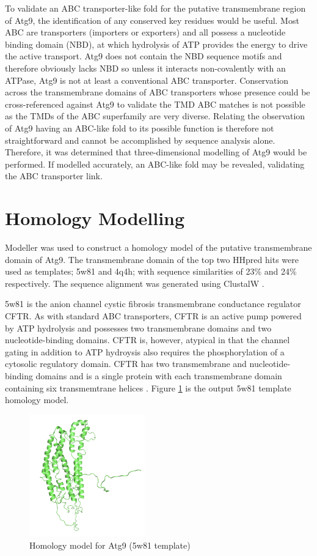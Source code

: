 To validate an ABC transporter-like fold for the putative transmembrane region of Atg9, the identification of any conserved key residues would be useful. Most ABC are transporters (importers or exporters) and all possess a nucleotide binding domain (NBD), at which hydrolysis of ATP provides the energy to drive the active transport. Atg9 does not contain the NBD sequence motifs and therefore obviously lacks NBD so unless it interacts non-covalently with an ATPase, Atg9 is not at least a conventional ABC transporter.  Conservation across the transmembrane domains of ABC transporters whose presence could be cross-referenced against Atg9 to validate the TMD ABC matches is not possible as the TMDs of the ABC superfamily are very diverse. Relating the observation of Atg9 having an ABC-like fold to its possible function is therefore not straightforward and cannot be accomplished by sequence analysis alone. Therefore, it was determined that three-dimensional modelling of Atg9 would be performed.  If modelled accurately, an ABC-like fold may be revealed, validating the ABC transporter link. 


\section{Homology Modelling}

Modeller was used to construct a homology model of the putative transmembrane domain of Atg9. The transmembrane domain of the top two HHpred hits were used as templates; 5w81 and 4q4h; with sequence similarities of 23\% and 24\% respectively. The sequence alignment was generated using ClustalW \cite{thompson2003multiple}. 

5w81 is the anion channel cystic fibrosis transmembrane conductance regulator CFTR. As with standard ABC transporters, CFTR is an active pump powered by ATP hydrolysis and possesses two transmembrane domains and two nucleotide-binding domains. CFTR is, however, atypical in that the channel gating in addition to ATP hydroysis also requires the phosphorylation of a cytosolic regulatory domain.  CFTR has two transmembrane and nucleotide-binding domains and is a single protein with each transmembrane domain containing six transmemtrane helices \cite{zhang2017conformational}. Figure \ref{fig:5w81_hmo} is the output 5w81 template homology model.


\begin{figure}[th!]
    \centering
    \includegraphics[width=50mm, scale=0.5]{Modelling of Atg9/atg9_hmo_5w81.png}
    \caption{Homology model for Atg9 (5w81 template)}
    \label{fig:5w81_hmo}
    \small
\end{figure}

